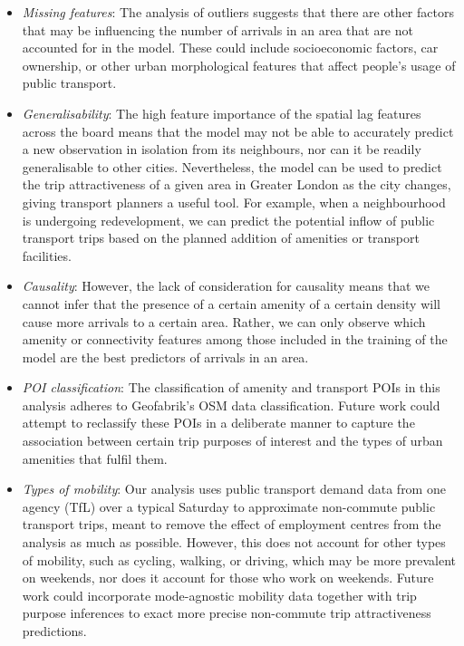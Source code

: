 \begin{itemize}
    \setlength\itemsep{0em}
    \item \textit{Missing features}: The analysis of outliers suggests that there are other factors that may be influencing the number of arrivals in an area that are not accounted for in the model. These could include socioeconomic factors, car ownership, or other urban morphological features that affect people's usage of public transport.
    \item \textit{Generalisability}: The high feature importance of the spatial lag features across the board means that the model may not be able to accurately predict a new observation in isolation from its neighbours, nor can it be readily generalisable to other cities. Nevertheless, the model can be used to predict the trip attractiveness of a given area in Greater London as the city changes, giving transport planners a useful tool. For example, when a neighbourhood is undergoing redevelopment, we can predict the potential inflow of public transport trips based on the planned addition of amenities or transport facilities.
    \item \textit{Causality}: However, the lack of consideration for causality means that we cannot infer that the presence of a certain amenity of a certain density will cause more arrivals to a certain area. Rather, we can only observe which amenity or connectivity features among those included in the training of the model are the best predictors of arrivals in an area.
    \item \textit{POI classification}: The classification of amenity and transport POIs in this analysis adheres to Geofabrik's OSM data classification. Future work could attempt to reclassify these POIs in a deliberate manner to capture the association between certain trip purposes of interest and the types of urban amenities that fulfil them.
    \item \textit{Types of mobility}: Our analysis uses public transport demand data from one agency (TfL) over a typical Saturday to approximate non-commute public transport trips, meant to remove the effect of employment centres from the analysis as much as possible. However, this does not account for other types of mobility, such as cycling, walking, or driving, which may be more prevalent on weekends, nor does it account for those who work on weekends. Future work could incorporate mode-agnostic mobility data together with trip purpose inferences to exact more precise non-commute trip attractiveness predictions.
\end{itemize}